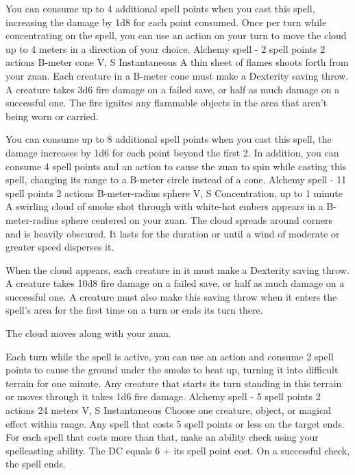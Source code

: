         You can consume up to 4 additional spell points when you cast this spell, increasing the damage by 1d8 for each point consumed.
        Once per turn while concentrating on the spell, you can use an action on your turn to move the cloud up to 4 meters in a direction of your choice.
        {Alchemy spell - 2 spell points}
        {2 actions}
        {B-meter cone}
        {V, S}
        {Instantaneous}
        A thin sheet of flames shoots forth from your zuan.
        Each creature in a B-meter cone must make a Dexterity saving throw.
        A creature takes 3d6 fire damage on a failed save, or half as much damage on a successful one.
        The fire ignites any flammable objects in the area that aren't being worn or carried.

        You can consume up to 8 additional spell points when you cast this spell, the damage increases by 1d6 for each point beyond the first 2.
        In addition, you can consume 4 spell points and an action to cause the zuan to spin while casting this spell, changing its range to a B-meter circle instead of a cone.
        {Alchemy spell - 11 spell points}
        {2 actions}
        {B-meter-radius sphere}
        {V, S}
        {Concentration, up to 1 minute}
        A swirling cloud of smoke shot through with white-hot embers appears in a B-meter-radius sphere centered on your zuan.
        The cloud spreads around corners and is heavily obscured.
        It lasts for the duration or until a wind of moderate or greater speed disperses it.

        When the cloud appears, each creature in it must make a Dexterity saving throw.
        A creature takes 10d8 fire damage on a failed save, or half as much damage on a successful one.
        A creature must also make this saving throw when it enters the spell's area for the first time on a turn or ends its turn there.

        The cloud moves along with your zuan.

        Each turn while the spell is active, you can use an action and consume 2 spell points to cause the ground under the smoke to heat up, turning it into difficult terrain for one minute.
        Any creature that starts its turn standing in this terrain or moves through it takes 1d6 fire damage.
        {Alchemy spell - 5 spell points}
        {2 actions}
        {24 meters}
        {V, S}
        {Instantaneous}
        Choose one creature, object, or magical effect within range.
        Any spell that costs 5 spell points or less on the target ends.
        For each spell that costs more than that, make an ability check using your spellcasting ability.
        The DC equals 6 + its spell point cost.
        On a successful check, the spell ends.

